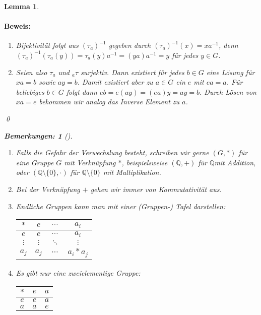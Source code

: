 \documentclass{report}
\newcommand{\Q}{\mathbb{Q}}
\newcommand{\mQ}{\(\mathbb{Q}\)}
\theoremstyle{customrem}
\newtheorem*{bemerkung2}{Bemerkungen\textnormal:}
\newenvironment{bemerkungen}[1][]{\begin{bemerkung2}[#1]\leavevmode}{\end{bemerkung2}}
\theoremstyle{customdef}
\newtheorem{lemma}[definition]{Lemma}
\renewenvironment{proof}{\paragraph{Beweis: }}{\qed}
\theoremstyle{customenv}
\begin{document}
\begin{lemma}
		\begin{proof}
			\begin{enumerate}
				\item Bijektivität folgt aus  \((\tau_a)^{-1}\) gegeben durch \((\tau_a)^{-1}(x) = x a^{-1}\), denn \((\tau_a)^{-1}(\tau_a(y)) = \tau_a(y)a^{-1} = (y a) a^{-1} = y\) für jedes \(y \in G\).
				\item Seien also \(\tau_a\) und \(_{a}\tau\) surjektiv. Dann existiert für jedes \(b \in G\) eine Lösung für
				\(x a = b\) sowie \(a y = b\).
				Damit existiert aber zu \(a \in G\) ein  \(e\) mit \(ea = a\). Für beliebiges \(b \in G\) folgt dann \(e b = e (a y) = (e a) y = ay = b\).	Durch Lösen von \(x a = e\) bekommen wir analog das Inverse Element zu \(a\).
			\end{enumerate}
		\end{proof}
		\vspace{.25cm}
		\begin{bemerkungen}
			\begin{enumerate}
				\item Falls die Gefahr der Verwechslung besteht, schreiben wir gerne \((G, \ast)\) für eine Gruppe \(G\) mit Verknüpfung \(\ast\),
				beispielsweise \((\Q, +)\) für \mQ mit Addition, oder \((\Q \setminus \{0\}, \cdot)\) für \(\Q \setminus \{0\}\) mit Multiplikation.
				\item Bei der Verknüpfung \(+\) gehen wir immer von Kommutativität aus.
				\item Endliche Gruppen kann man mit einer (Gruppen-) Tafel darstellen:
				\begin{center}
					\begin{tabular}{c || c  c  c}
						\(\ast\)   & \(e\)      & \(\cdots\) & \(a_i\)	    \\\hline\hline
						\(e\)      & \(e\)      & \(\cdots\)	& \(a_i\)     \\
						\(\vdots\) & \(\vdots\) & \(\ddots\)	& \(\vdots\)  \\
						\(a_j\) 	 &\(a_j\)     & \(\cdots\)	& \(a_i * a_j\)
					\end{tabular}
				\end{center}\pagebreak[2]

				\item Es gibt nur eine zweielementige Gruppe:
				\begin{center}
					\begin{tabular}{c || c | c}
						\(\ast\) & \(e\) & \(a\)\\\hline\hline
						\(e\)    & \(e\) & \(a\)\\\hline
						\(a\)    & \(a\) & \(e\)
					\end{tabular}
				\end{center}
			\end{enumerate}
		\end{bemerkungen}
	\end{lemma}
\end{document}
